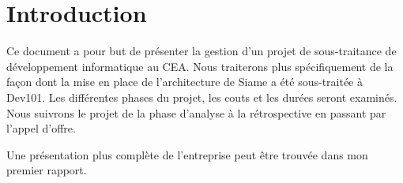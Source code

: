 \chapter*{Introduction}


Ce document a pour but de présenter la gestion d'un projet de sous-traitance de développement informatique au CEA. Nous traiterons plus spécifiquement de la façon dont la mise en place de l'architecture de Siame a été sous-traitée à Dev101. Les différentes phases du projet, les couts et les durées seront examinés. Nous suivrons le projet de la phase d'analyse à la rétrospective en passant par l'appel d'offre.

Une présentation plus complète de l'entreprise peut être trouvée dans mon premier rapport.

